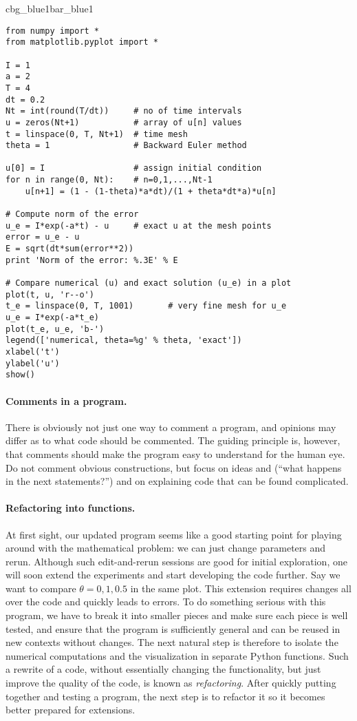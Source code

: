 \documentclass[graybox,sectrefs,envcountresetchap,open=right,final]{svmonodo}
\newenvironment{_pro_tight}[2]{
   \def\FrameCommand{\color{#2}\vrule width 1mm\normalcolor\colorbox{#1}}
   \FrameRule0.6pt\MakeFramed {\advance\hsize-2mm\FrameRestore}\vskip3mm}
   {\vskip0mm\endMakeFramed}
\newenvironment{pro}[2]{
\bgroup\rmfamily
\fboxsep=0mm\relax
\begin{_pro_tight}{#1}{#2}
\list{}{\parsep=-2mm\parskip=0mm\topsep=0pt\leftmargin=2mm
\rightmargin=2\leftmargin\leftmargin=4pt\relax}
\item\relax}
{\endlist\end{_pro_tight}\egroup}
\begin{document}
\begin{pro}{cbg_blue1}{bar_blue1}\begin{Verbatim}[numbers=none,fontsize=\fontsize{9pt}{9pt},baselinestretch=0.95,xleftmargin=2mm]
from numpy import *
from matplotlib.pyplot import *

I = 1
a = 2
T = 4
dt = 0.2
Nt = int(round(T/dt))     # no of time intervals
u = zeros(Nt+1)           # array of u[n] values
t = linspace(0, T, Nt+1)  # time mesh
theta = 1                 # Backward Euler method

u[0] = I                  # assign initial condition
for n in range(0, Nt):    # n=0,1,...,Nt-1
    u[n+1] = (1 - (1-theta)*a*dt)/(1 + theta*dt*a)*u[n]

# Compute norm of the error
u_e = I*exp(-a*t) - u     # exact u at the mesh points
error = u_e - u
E = sqrt(dt*sum(error**2))
print 'Norm of the error: %.3E' % E

# Compare numerical (u) and exact solution (u_e) in a plot
plot(t, u, 'r--o')
t_e = linspace(0, T, 1001)       # very fine mesh for u_e
u_e = I*exp(-a*t_e)
plot(t_e, u_e, 'b-')
legend(['numerical, theta=%g' % theta, 'exact'])
xlabel('t')
ylabel('u')
show()
\end{Verbatim}
\end{pro}
\noindent

\paragraph{Comments in a program.}
There is obviously not just one way to comment a program, and opinions
may differ as to what code should be commented.
The guiding principle is, however, that comments should make the
program easy to understand for the human eye. Do not comment obvious
constructions, but focus on ideas and (``what happens in the next
statements?'') and on explaining code that can be found
complicated.



\paragraph{Refactoring into functions.}
At first sight, our updated program seems like
a good starting point for playing around
with the mathematical problem: we can just change parameters and rerun.
Although such edit-and-rerun sessions are good for initial exploration,
one will soon extend the experiments and start developing the code
further. Say we want to compare $\theta =0,1,0.5$ in the same
plot. This extension requires changes all over the code and quickly
leads to errors. To do something serious with this program, we have to
break it into smaller pieces and make sure each piece is well tested,
and ensure that the program is sufficiently general and can be reused in
new contexts without changes.  The
next natural step is therefore to isolate the numerical computations
and the visualization in separate Python functions.
Such a rewrite of a code, without essentially changing the functionality,
but just improve the quality of the code, is known as \emph{refactoring}.
After quickly putting together and testing a program, the next
step is to refactor it so it becomes better prepared for extensions.
\end{document}

